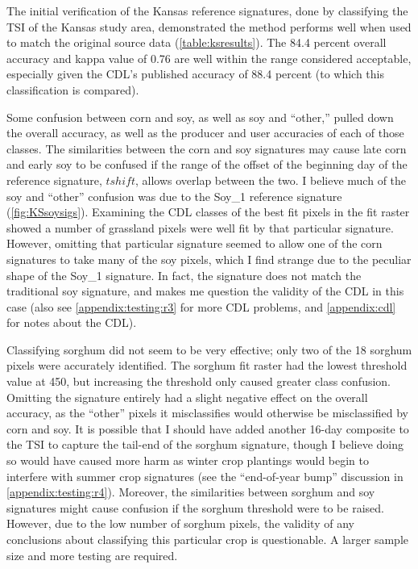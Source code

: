 The initial verification of the Kansas reference signatures, done by classifying the TSI of the Kansas study area, demonstrated the method performs well when used to match the original source data (\autoref{table:ksresults}). The 84.4 percent overall accuracy and kappa value of 0.76 are well within the range considered acceptable, especially given the CDL's published accuracy of 88.4 percent (to which this classification is compared).

Some confusion between corn and soy, as well as soy and ``other,'' pulled down the overall accuracy, as well as the producer and user accuracies of each of those classes. The similarities between the corn and soy signatures may cause late corn and early soy to be confused if the range of the offset of the beginning day of the reference signature, $tshift$, allows overlap between the two. I believe much of the soy and ``other'' confusion was due to the Soy\_1 reference signature (\autoref{fig:KSsoysigs}). Examining the CDL classes of the best fit pixels in the fit raster showed a number of grassland pixels were well fit by that particular signature. However, omitting that particular signature seemed to allow one of the corn signatures to take many of the soy pixels, which I find strange due to the peculiar shape of the Soy\_1 signature. In fact, the signature does not match the traditional soy signature, and makes me question the validity of the CDL in this case (also see \autoref{appendix:testing:r3} for more CDL problems, and \autoref{appendix:cdl} for notes about the CDL).

Classifying sorghum did not seem to be very effective; only two of the 18 sorghum pixels were accurately identified. The sorghum fit raster had the lowest threshold value at 450, but increasing the threshold only caused greater class confusion. Omitting the signature entirely had a slight negative effect on the overall accuracy, as the ``other'' pixels it misclassifies would otherwise be misclassified by corn and soy. It is possible that I should have added another 16-day composite to the TSI to capture the tail-end of the sorghum signature, though I believe doing so would have caused more harm as winter crop plantings would begin to interfere with summer crop signatures (see the ``end-of-year bump'' discussion in \autoref{appendix:testing:r4}). Moreover, the similarities between sorghum and soy signatures might cause confusion if the sorghum threshold were to be raised. However, due to the low number of sorghum pixels, the validity of any conclusions about classifying this particular crop is questionable. A larger sample size and more testing are required.

